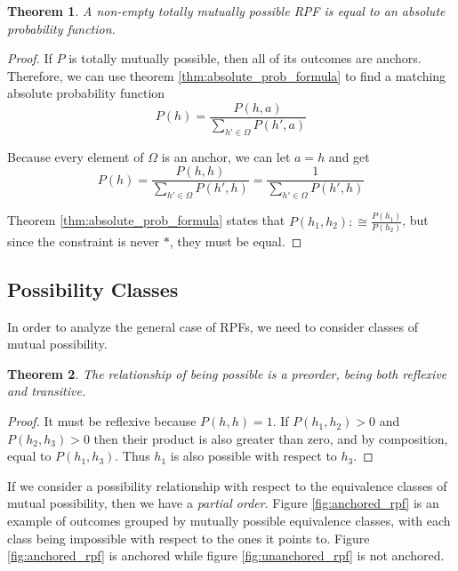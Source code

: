 \documentclass[twoside]{article}
\theoremstyle{plain}%
\newtheorem{theorem}{Theorem}[section]
\theoremstyle{definition}
\theoremstyle{remark}
\begin{document}
\begin{theorem}
A non-empty totally mutually possible RPF is equal to an absolute probability function.
\end{theorem}

\begin{proof}
If \(P\) is totally mutually possible, then all of its outcomes are anchors. Therefore, we can use theorem \ref{thm:absolute_prob_formula} to find a matching absolute probability function
\[P(h) = \frac{P(h, a)}{\sum_{h' \in \Omega}P(h', a)}\]

Because every element of \(\Omega\) is an anchor, we can let \(a = h\) and get
\[P(h) = \frac{P(h, h)}{\sum_{h' \in \Omega}P(h', h)}=\frac{1}{\sum_{h' \in \Omega}P(h', h)}\]

Theorem \ref{thm:absolute_prob_formula} states that \(P(h_1, h_2) :\cong \frac{P(h_1)}{P(h_2)}\), but since the constraint is never \(\ast\), they must be equal.
\end{proof}

\subsection{Possibility Classes}
\label{section:possibility_classes}

In order to analyze the general case of RPFs, we need to consider classes of mutual possibility.

\begin{theorem}
The relationship of being possible is a \textit{preorder}, being both reflexive and transitive.
\end{theorem}

\begin{proof}
It must be reflexive because \(P(h, h) = 1\). If \(P(h_1, h_2) > 0\) and \(P(h_2, h_3) > 0\) then their product is also greater than zero, and by composition, equal to \(P(h_1, h_3)\). Thus \(h_1\) is also possible with respect to \(h_3\).
\end{proof}

If we consider a possibility relationship with respect to the equivalence classes of mutual possibility, then we have a \textit{partial order}. Figure \ref{fig:anchored_rpf} is an example of outcomes grouped by mutually possible equivalence classes, with each class being impossible with respect to the ones it points to. Figure \ref{fig:anchored_rpf} is anchored while figure \ref{fig:unanchored_rpf} is not anchored.
\end{document}
